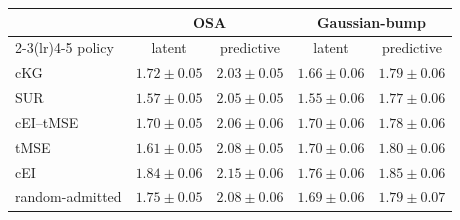 \begin{tabular}{@{}lcccc@{}}
\toprule
 & \multicolumn{2}{c}{OSA} & \multicolumn{2}{c}{Gaussian-bump} \\
\cmidrule(lr){2-3}\cmidrule(lr){4-5}
policy & latent & predictive & latent & predictive \\
\midrule
cKG & $1.72{\pm}0.05$ & $2.03{\pm}0.05$ & $1.66{\pm}0.06$ & $1.79{\pm}0.06$ \\
SUR & $1.57{\pm}0.05$ & $2.05{\pm}0.05$ & $1.55{\pm}0.06$ & $1.77{\pm}0.06$ \\
cEI--tMSE & $1.70{\pm}0.05$ & $2.06{\pm}0.06$ & $1.70{\pm}0.06$ & $1.78{\pm}0.06$ \\
tMSE & $1.61{\pm}0.05$ & $2.08{\pm}0.05$ & $1.70{\pm}0.06$ & $1.80{\pm}0.06$ \\
cEI & $1.84{\pm}0.06$ & $2.15{\pm}0.06$ & $1.76{\pm}0.06$ & $1.85{\pm}0.06$ \\
random-admitted & $1.75{\pm}0.05$ & $2.08{\pm}0.06$ & $1.69{\pm}0.06$ & $1.79{\pm}0.07$ \\
\bottomrule
\end{tabular}
